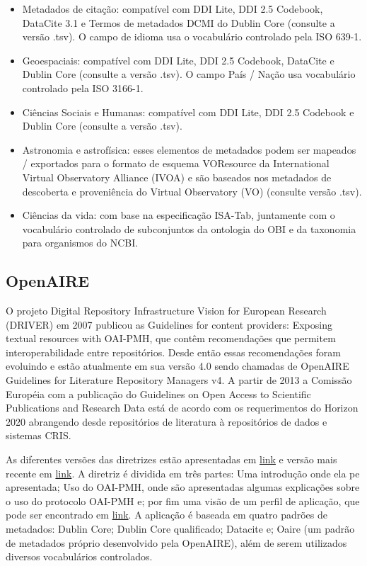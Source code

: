 \documentclass[12pt,hidelinks]{article}
\begin{document}
    \begin{itemize}
\item Metadados de citação: compatível com DDI Lite, DDI 2.5 Codebook, DataCite 3.1 e Termos de metadados DCMI do Dublin Core (consulte a versão .tsv). O campo de idioma usa o vocabulário controlado pela ISO 639-1.
\item Geoespaciais: compatível com DDI Lite, DDI 2.5 Codebook, DataCite e Dublin Core (consulte a versão .tsv). O campo País / Nação usa vocabulário controlado pela ISO 3166-1.
\item Ciências Sociais e Humanas: compatível com DDI Lite, DDI 2.5 Codebook e Dublin Core (consulte a versão .tsv).
\item Astronomia e astrofísica: esses elementos de metadados podem ser mapeados / exportados para o formato de esquema VOResource da International Virtual Observatory Alliance (IVOA) e são baseados nos metadados de descoberta e proveniência do Virtual Observatory (VO) (consulte versão .tsv).
\item Ciências da vida: com base na especificação ISA-Tab, juntamente com o vocabulário controlado de subconjuntos da ontologia do OBI e da taxonomia para organismos do NCBI.
    \end{itemize}
    
     \subsection{OpenAIRE}
     
\qquad O projeto Digital Repository Infrastructure Vision for European Research  (DRIVER) em 2007 publicou as Guidelines for content providers: Exposing textual resources with OAI-PMH, que contêm recomendações que permitem interoperabilidade entre repositórios. Desde então essas recomendações foram evoluindo e estão atualmente em sua versão 4.0 sendo chamadas de OpenAIRE Guidelines for Literature Repository Managers v4. A partir de 2013 a Comissão Européia com a publicação do Guidelines on Open Access to Scientific Publications and Research Data está de acordo com os requerimentos do Horizon 2020 abrangendo desde repositórios de literatura à repositórios de dados e sistemas CRIS.
	
	As diferentes versões das diretrizes estão apresentadas em \hyperlink{https://guidelines.openaire.eu/en/latest/}{ link} e versão mais recente em \hyperlink{https://openaire-guidelines-for-literature-repository-managers.readthedocs.io/en/v4.0.0/index.html}{ link}. A diretriz é dividida em três partes: Uma introdução onde ela pe apresentada; Uso do OAI-PMH, onde são apresentadas algumas explicações sobre o uso do protocolo OAI-PMH e; por fim uma visão de um perfil de aplicação, que pode ser encontrado em  \hyperlink{https://openaire-guidelines-for-literature-repository-managers.readthedocs.io/en/v4.0.0/application\_profile.html}{ link}. A aplicação é baseada em quatro padrões de metadados: Dublin Core; Dublin Core qualificado; Datacite e; Oaire (um padrão de metadados próprio desenvolvido pela OpenAIRE), além de serem utilizados diversos vocabulários controlados.\\
	
\end{document}
